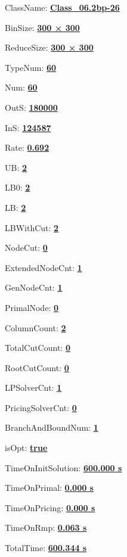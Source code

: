 \documentclass[11pt]{article}
\begin{document}
\pagestyle{empty}


ClassName: \underline{\textbf{Class_06.2bp-26}}
\par
BinSize: \underline{\textbf{300 × 300}}
\par
ReduceSize: \underline{\textbf{300 × 300}}
\par
TypeNum: \underline{\textbf{60}}
\par
Num: \underline{\textbf{60}}
\par
OutS: \underline{\textbf{180000}}
\par
InS: \underline{\textbf{124587}}
\par
Rate: \underline{\textbf{0.692}}
\par
UB: \underline{\textbf{2}}
\par
LB0: \underline{\textbf{2}}
\par
LB: \underline{\textbf{2}}
\par
LBWithCut: \underline{\textbf{2}}
\par
NodeCut: \underline{\textbf{0}}
\par
ExtendedNodeCnt: \underline{\textbf{1}}
\par
GenNodeCnt: \underline{\textbf{1}}
\par
PrimalNode: \underline{\textbf{0}}
\par
ColumnCount: \underline{\textbf{2}}
\par
TotalCutCount: \underline{\textbf{0}}
\par
RootCutCount: \underline{\textbf{0}}
\par
LPSolverCnt: \underline{\textbf{1}}
\par
PricingSolverCnt: \underline{\textbf{0}}
\par
BranchAndBoundNum: \underline{\textbf{1}}
\par
isOpt: \underline{\textbf{true}}
\par
TimeOnInitSolution: \underline{\textbf{600.000 s}}
\par
TimeOnPrimal: \underline{\textbf{0.000 s}}
\par
TimeOnPricing: \underline{\textbf{0.000 s}}
\par
TimeOnRmp: \underline{\textbf{0.063 s}}
\par
TotalTime: \underline{\textbf{600.344 s}}
\par
\newpage
\end{document}
